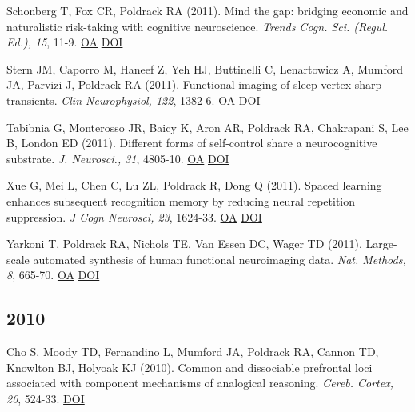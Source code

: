 Schonberg T, Fox CR, Poldrack RA (2011). Mind the gap: bridging economic and naturalistic risk-taking with cognitive neuroscience. \textit{Trends Cogn. Sci. (Regul. Ed.), 15}, 11-9. \href{https://www.ncbi.nlm.nih.gov/pmc/articles/PMC3014440}{OA} \href{http://dx.doi.org/10.1016/j.tics.2010.10.002}{DOI} \vspace{2mm}

Stern JM, Caporro M, Haneef Z, Yeh HJ, Buttinelli C, Lenartowicz A, Mumford JA, Parvizi J, Poldrack RA (2011). Functional imaging of sleep vertex sharp transients. \textit{Clin Neurophysiol, 122}, 1382-6. \href{https://www.ncbi.nlm.nih.gov/pmc/articles/PMC3105179}{OA} \href{http://dx.doi.org/10.1016/j.clinph.2010.12.049}{DOI} \vspace{2mm}

Tabibnia G, Monterosso JR, Baicy K, Aron AR, Poldrack RA, Chakrapani S, Lee B, London ED (2011). Different forms of self-control share a neurocognitive substrate. \textit{J. Neurosci., 31}, 4805-10. \href{https://www.ncbi.nlm.nih.gov/pmc/articles/PMC3096483}{OA} \href{http://dx.doi.org/10.1523/jneurosci.2859-10.2011}{DOI} \vspace{2mm}

Xue G, Mei L, Chen C, Lu ZL, Poldrack R, Dong Q (2011). Spaced learning enhances subsequent recognition memory by reducing neural repetition suppression. \textit{J Cogn Neurosci, 23}, 1624-33. \href{https://www.ncbi.nlm.nih.gov/pmc/articles/PMC3297428}{OA} \href{http://dx.doi.org/10.1162/jocn.2010.21532}{DOI} \vspace{2mm}

Yarkoni T, Poldrack RA, Nichols TE, Van Essen DC, Wager TD (2011). Large-scale automated synthesis of human functional neuroimaging data. \textit{Nat. Methods, 8}, 665-70. \href{https://www.ncbi.nlm.nih.gov/pmc/articles/PMC3146590}{OA} \href{http://dx.doi.org/10.1038/nmeth.1635}{DOI} \vspace{2mm}

\subsection*{2010}

Cho S, Moody TD, Fernandino L, Mumford JA, Poldrack RA, Cannon TD, Knowlton BJ, Holyoak KJ (2010). Common and dissociable prefrontal loci associated with component mechanisms of analogical reasoning. \textit{Cereb. Cortex, 20}, 524-33. \href{http://dx.doi.org/10.1093/cercor/bhp121}{DOI} \vspace{2mm}

